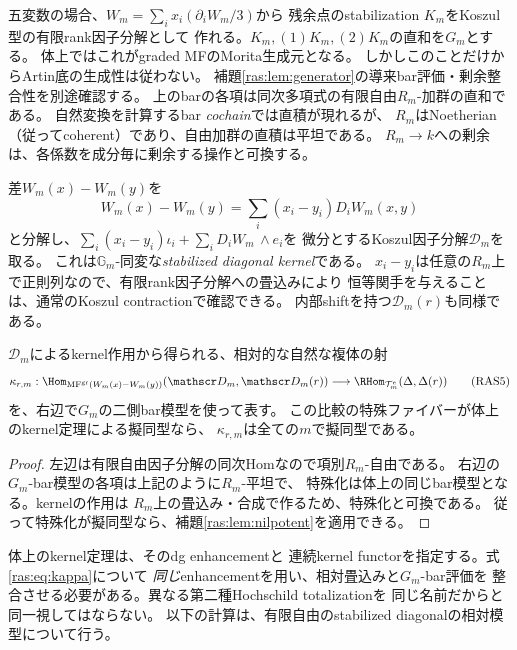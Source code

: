 五変数の場合、$W_m=\sum_i x_i(\partial_iW_m/3)$から
残余点のstabilization $K_m$をKoszul型の有限rank因子分解として
作れる。$K_m,(1)K_m,(2)K_m$の直和を$G_m$とする。
体上ではこれがgraded MFのMorita生成元となる\cite{RASDyck,RASBFK}。
しかしこのことだけからArtin底の生成性は従わない。
補題\ref{ras:lem:generator}の導来bar評価・剰余整合性を別途確認する。
上のbarの各項は同次多項式の有限自由$R_m$-加群の直和である。
自然変換を計算するbar \emph{cochain}では直積が現れるが、
$R_m$はNoetherian（従ってcoherent）であり、自由加群の直積は平坦である。
$R_m\to k$への剰余は、各係数を成分毎に剰余する操作と可換する。

差$W_m(x)-W_m(y)$を
\[
 W_m(x)-W_m(y)=\sum_i(x_i-y_i)D_iW_m(x,y)
\]
と分解し、$\sum_i(x_i-y_i)\iota_i+\sum_iD_iW_m\,\wedge e_i$を
微分とするKoszul因子分解$\mathscr D_m$を取る。
これは$\mathbb G_m$-同変な\emph{stabilized diagonal kernel}である。
$x_i-y_i$は任意の$R_m$上で正則列なので、有限rank因子分解への畳込みにより
恒等関手を与えることは、通常のKoszul contractionで確認できる。
内部shiftを持つ$\mathscr D_m(r)$も同様である。

\begin{proposition}[相対kernel作用のnilpotent検出]\label{ras:prop:kernel-action}
$\mathscr D_m$によるkernel作用から得られる、相対的な自然な複体の射
\[
 \kappa_{r,m}:\Hom_{\mathrm{MF}^{\rm gr}(W_m(x)-W_m(y))}
 (\mathscr D_m,\mathscr D_m(r))
 \longrightarrow
 \RHom_{\mathcal T_m^e}(\Delta,\Delta(r))
 \tag{RAS5}\label{ras:eq:kappa}
\]
を、右辺で$G_m$の二側bar模型を使って表す。
この比較の特殊ファイバーが体上のkernel定理による擬同型なら、
$\kappa_{r,m}$は全ての$m$で擬同型である。
\end{proposition}
\begin{proof}
左辺は有限自由因子分解の同次Homなので項別$R_m$-自由である。
右辺の$G_m$-bar模型の各項は上記のように$R_m$-平坦で、
特殊化は体上の同じbar模型となる。kernelの作用は
$R_m$上の畳込み・合成で作るため、特殊化と可換である。
従って特殊化が擬同型なら、補題\ref{ras:lem:nilpotent}を適用できる。
\end{proof}

\begin{remark}[比較の適用範囲]
体上のkernel定理\cite{RASBFK}は、そのdg enhancementと
連続kernel functorを指定する。式\eqref{ras:eq:kappa}について
\emph{同じ}enhancementを用い、相対畳込みと$G_m$-bar評価を
整合させる必要がある。異なる第二種Hochschild totalizationを
同じ名前だからと同一視してはならない。
以下の計算は、有限自由のstabilized diagonalの相対模型について行う。
\end{remark}

